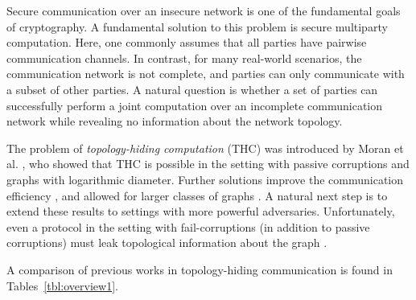 
Secure communication over an insecure network is one of the fundamental goals of cryptography. 
A fundamental solution to this problem is secure multiparty computation. Here, one commonly assumes that all parties have pairwise communication channels.
In contrast, for many real-world scenarios, the communication network is not complete, and parties can only communicate with a subset of other parties. A natural question is whether a set of parties can successfully perform a joint computation over an incomplete communication network while revealing no information about the network topology.

The problem of \emph{topology-hiding computation} (THC) 
was introduced by Moran et al. \cite{TCC:MorOrlRic15}, who showed that 
THC is possible in the setting with passive corruptions and graphs with logarithmic diameter. Further solutions improve the 
communication efficiency \cite{C:HMTZ16}, and allowed for larger classes of graphs \cite{EC:AkaMor17,ALM17}.
A natural next step is to extend these results to settings with  more powerful adversaries. Unfortunately, even a protocol in the setting with fail-corruptions (in addition to passive corruptions) must leak topological information about the graph \cite{TCC:MorOrlRic15}.

A comparison of previous works in topology-hiding communication is found in Tables~\ref{tbl:overview1}.

